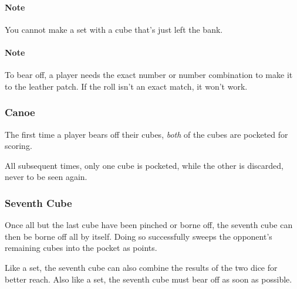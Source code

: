\paragraph{Note} You cannot make a set with a cube that's just left the bank.

\paragraph{Note} To bear off, a player needs the exact number or number combination to make it to the leather patch. If the roll isn't an exact match, it won't work.

\subsubsection{Canoe}
The first time a player bears off their cubes, \textit{both} of the cubes are pocketed for scoring.

All subsequent times, only one cube is pocketed, while the other is discarded, never to be seen again.

\subsubsection{Seventh Cube}
Once all but the last cube have been pinched or borne off, the seventh cube can then be borne off all by itself.
Doing so successfully sweeps the opponent's remaining cubes into the pocket as points.

Like a set, the seventh cube can also combine the results of the two dice for better reach.
Also like a set, the seventh cube must bear off as soon as possible.